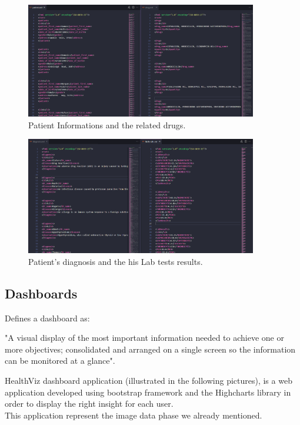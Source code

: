 \begin{figure}[h!]
    \center
    \includegraphics[width=0.90\textwidth]{images/chapter4/result1.PNG}
    \caption{Patient Informations and the related drugs.}
    \label{fig:resultone}
\end{figure}
\begin{figure}[h!]
    \center
    \includegraphics[width=0.90\textwidth]{images/chapter4/result2.PNG}
    \caption{Patient's diagnosis and the his Lab tests results.}
    \label{fig:resulttwo}
\end{figure}

\subsection{Dashboards}
\cite{hynekAutomaticEvaluationInformation2015} Defines a dashboard as:
\begin{displayquote}
    "A visual display of the most important information needed to achieve one or more objectives; consolidated and arranged on a single screen so the information can be monitored at a glance". \end{displayquote}

HealthViz dashboard application (illustrated in the following pictures), is a web application developed using bootstrap\cite{IntroductionBootstrapV5}  framework and the Highcharts  library in order to display the right insight for each user.\\
This application represent the image data phase we already mentioned. 


